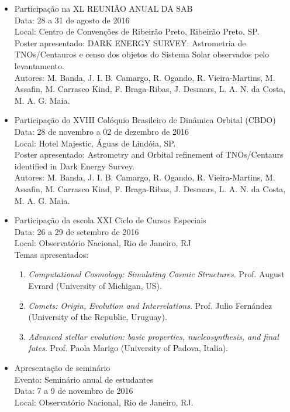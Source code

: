 \documentclass[a4paper, 11pt]{article}
\begin{document}
\begin{itemize}
\item Participa\c{c}\~ao na XL REUNI\~AO ANUAL DA SAB\\
Data: 28 a 31 de agosto de 2016\\
Local: Centro de Conven\c{c}\~oes de Ribeir\~ao Preto, Ribeir\~ao Preto, SP.\\
Poster apresentado: DARK ENERGY SURVEY: Astrometria de TNOs/Centauros e censo dos objetos do Sistema Solar observados pelo levantamento.\\
Autores:  M. Banda, J. I. B. Camargo, R. Ogando, R. Vieira-Martins,  M. Assafin, M. Carrasco Kind, F. Braga-Ribas, J. Desmars, L. A. N. da Costa, M. A. G. Maia.
\item Participa\c{c}\~ao do XVIII Col\'oquio Brasileiro de Din\^amica Orbital (CBDO)\\
Data: 28 de novembro a 02 de dezembro de 2016\\
Local: Hotel Majestic, \'Aguas de Lind\'oia, SP.\\
Poster apresentado: Astrometry and Orbital refinement of TNOs/Centaurs identified in Dark Energy Survey.\\
Autores:  M. Banda, J. I. B. Camargo, R. Ogando, R. Vieira-Martins,  M. Assafin, M. Carrasco Kind, F. Braga-Ribas, J. Desmars, L. A. N. da Costa, M. A. G. Maia.
\item Participa\c{c}\~ao da escola XXI Ciclo de Cursos Especiais\\
Data: 26 a 29 de setembro de 2016\\
Local: Observat\'orio Nacional, Rio de Janeiro, RJ\\
Temas apresentados:
\begin{enumerate}
\item \textit{Computational Cosmology: Simulating Cosmic Structures}. Prof. August Evrard (University of Michigan, US).
\item \textit{Comets: Origin, Evolution and Interrelations}. Prof. Julio Fern\'andez (University of the Republic, Uruguay).
\item \textit{Advanced stellar evolution: basic properties, nucleosynthesis, and final fates}. Prof. Paola Marigo (University of Padova, Italia).
\end{enumerate}
\item Apresenta\c{c}\~ao de semin\'ario \\
Evento: Semin\'ario anual de estudantes\\
Data: 7 a 9 de novembro de 2016\\
Local: Observat\'orio Nacional, Rio de Janeiro, RJ.
\end{itemize}
\end{document}
